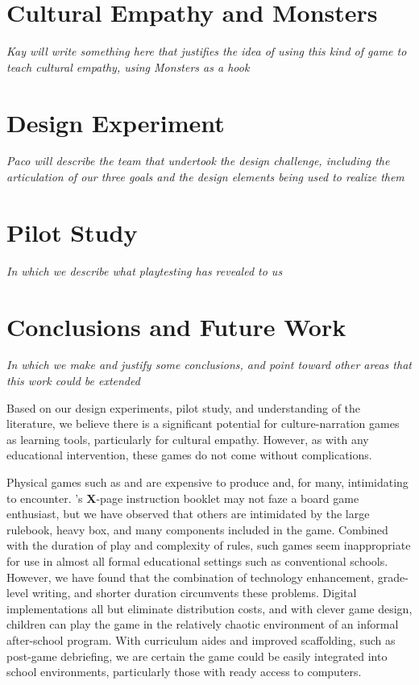 \documentclass[a4paper]{article}
\begin{document}
\section{Cultural Empathy and Monsters}

\textit{Kay will write something here that justifies the idea of using this kind of game to teach cultural empathy, using Monsters as a hook}

\section{Design Experiment}

\textit{Paco will describe the team that undertook the design challenge, including the articulation of our three goals and the design elements being used to realize them}

\section{Pilot Study}

\textit{In which we describe what playtesting has revealed to us}

\section{Conclusions and Future Work}

\textit{In which we make and justify some conclusions, and point toward
 other areas that this work could be extended}

Based on our design experiments, pilot study, and understanding of the
literature, we believe there is a significant potential for
culture-narration games as learning tools, particularly for
cultural empathy.
However, as with any educational intervention, these games do not
come without complications.

Physical games such as \totan{} and \smersh{} are expensive to produce
and, for many, intimidating to encounter. \totan{}'s \textbf{X}-page
instruction booklet may not faze a board game enthusiast, but we have
observed that others are intimidated by the large rulebook, heavy box,
and many components included in the game. Combined with the duration
of play and complexity of rules, such games seem inappropriate for use
in almost all formal educational settings such as conventional
schools.  However, we have found that the combination of technology
enhancement, grade-level writing, and shorter duration circumvents
these problems.  Digital implementations all but eliminate
distribution costs, and with clever game design, children can play the
game in the relatively chaotic environment of an informal after-school
program. With curriculum aides and improved scaffolding, such as
post-game debriefing, we are certain the game could be easily
integrated into school environments, particularly those with
ready access to computers.
\end{document}
